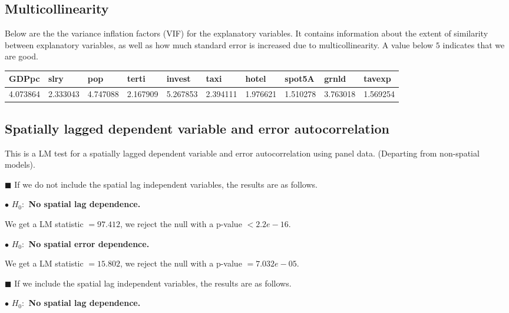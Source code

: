 \documentclass[11pt,a4paper]{amsart}
\theoremstyle{plain}
\theoremstyle{definition}
\begin{document}
\subsection{Multicollinearity}\hfill\par
Below are the the variance inflation factors (VIF) for the explanatory variables. It contains information about the extent of similarity between explanatory variables, as well as how much standard error is increased due to multicollinearity.  A value below $5$ indicates that we are good.
\begin{table}[H]
	\centering %
	\begin{tabularx}{\textwidth}{|X|X|X|X|X|X|X|X|X|X|}
		\hline
		GDPpc   &  slry    &  pop &   terti &  invest  &   taxi   &  hotel &  spot5A   &  grnld &  tavexp \\
	\hline
	4.073864& 2.333043  & 4.747088 & 2.167909 & 5.267853 & 2.394111 & 1.976621 & 1.510278 & 3.763018 & 1.569254 \\
		\hline
	\end{tabularx}
\end{table}

\subsection{Spatially lagged dependent variable and error autocorrelation}\hfill\par

This is a LM test for a spatially lagged dependent variable and error autocorrelation using panel data. (Departing from non-spatial models).

$\blacksquare$ If we do not include the spatial lag independent variables, the results are as follows. 

$\bullet$ \textbf{$H_{0}:$ No spatial lag dependence.} 

We get a LM statistic $= 97.412$, we reject the null with a  p-value $< 2.2e-16$. 

$\bullet$ \textbf{$H_{0}:$ No spatial error dependence.} 

We get a LM statistic $= 15.802$, we reject the null with a  p-value $= 7.032e-05$. 

\vspace{5pt}

$\blacksquare$ If we include the spatial lag independent variables, the results are as follows.

$\bullet$ \textbf{$H_{0}:$ No spatial lag dependence.} 
\end{document}
